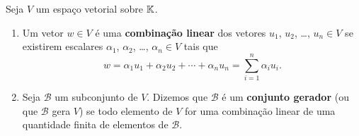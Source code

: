 \begin{definicao}
	Seja $V$ um espa\c{c}o vetorial sobre $\mathbb{K}$.
	\begin{enumerate}[label={\roman*})]
		\item Um vetor $w \in V$ \'e uma \textbf{combina\c{c}\~ao linear} dos vetores $u_1$, $u_2$, \dots, $u_n \in V$ se existirem escalares $\alpha_1$, $\alpha_2$, \dots, $\alpha_n \in V$ tais que
		\[
			w = \alpha_1 u_1 + \alpha_2u_2 + \cdots + \alpha_nu_n = \sum_{i = 1}^n \alpha_iu_i.
		\]
		\item Seja $\mathcal{B}$ um subconjunto de $V$. Dizemos que $\mathcal{B}$ \'e um \textbf{conjunto gerador} (ou que $\mathcal{B}$ gera $V$) se todo elemento de $V$ for uma combina\c{c}\~ao linear de uma quantidade finita de elementos de $\mathcal{B}$.
	\end{enumerate}
\end{definicao}

